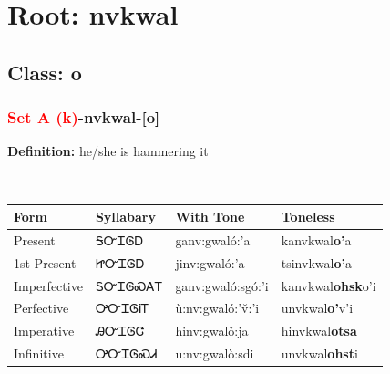 \needspace{4in}
\section*{Root: nvkwal}
\nopagebreak
{}
\needspace{3in}
\subsection*{Class: o}
\nopagebreak
\needspace{2in}
\subsubsection*{\textcolor{Red}{Set A (k)}{-}\textbf{nvkwal}{-}[o]}
\nopagebreak
\textbf{Definition: } he/she is hammering it
\\[0.5em]
\begin{tabularx}{\textwidth}{l X X X}%
\toprule%
\textbf{Form}&\textbf{Syllabary}&\textbf{With Tone}&\textbf{Toneless}\\%
\midrule%
Present&ᎦᏅᏆᎶᎠ&ganv:gwaló:’a&kanvkwal\textbf{o'}a\\%
1st Present&ᏥᏅᏆᎶᎠ&jinv:gwaló:’a&tsinvkwal\textbf{o'}a\\%
Imperfective&ᎦᏅᏆᎶᏍᎪᎢ&ganv:gwaló:sgó:’i&kanvkwal\textbf{ohsk}o'i\\%
Perfective&ᎤᏅᏆᎶᎥᎢ&ù:nv:gwaló:’v̌:’i&unvkwal\textbf{o'}v'i\\%
Imperative&ᎯᏅᏆᎶᏣ&hinv:gwalǒ:ja&hinvkwal\textbf{otsa}\\%
Infinitive&ᎤᏅᏆᎶᏍᏗ&u:nv:gwalò:sdi&unvkwal\textbf{ohst}i\\%
\bottomrule%
\end{tabularx}
\\[1em]